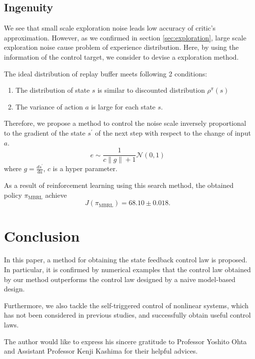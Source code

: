 \documentclass[english, dvipdfmx]{ampmt}             %
\begin{document}
\subsection{Ingenuity}
We see that small scale exploration noise leads low accuracy of critic's approximation. However, as we confirmed in section \ref{sec:exploration}, large scale exploration noise cause problem of experience distribution. Here, by using the information of the control target, we consider to devise a exploration method. \par
The ideal distribution of replay buffer meets following 2 conditions:
\begin{enumerate} 
	\item The distribution of state $s$ is similar to discounted distribution $\rho^{\pi}(s)$
	\item The variance of action $a$ is large for each state $s$.
\end{enumerate}
Therefore, we propose a method to control the noise scale inversely proportional to the gradient of the state $s^{\prime}$ of the next step with respect to the change of input $a$. 
\begin{equation}
	e \sim \frac{1}{c\|g\|+1} \mathcal{N}(0,1)
\end{equation}
where $g = \frac{ds^{\prime}}{da}$, $c$ is a hyper parameter. \par
As a result of reinforcement learning using this search method, the obtained policy $\pi_{\textrm{MBRL}}$ achieve
\begin{equation}
	J(\pi_{\textrm{MBRL}}) = 68.10 \pm 0.018 \label{ingenuity}.
\end{equation}


\section{Conclusion}
In this paper, a method for obtaining the state feedback control law is proposed. In particular, it is confirmed by numerical examples that the control law obtained by our method outperforms the control law designed by a naive model-based design. \par 
Furthermore, we also tackle the self-triggered control of nonlinear systems, which has not been considered in previous studies, and successfully obtain useful control laws. 



\acknowledgment
The author would like to express his sincere gratitude to Professor
Yoshito Ohta and Assistant Professor Kenji Kashima for their helpful advices.
\end{document}
